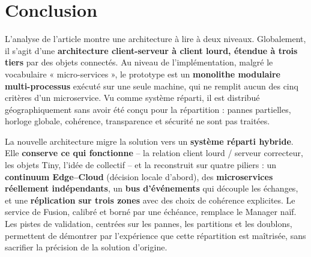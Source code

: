 \documentclass[11pt,a4paper]{article}
\begin{document}
\section{Conclusion}

L'analyse de l'article montre une architecture à lire à deux niveaux. Globalement, il s'agit d'une \textbf{architecture client-serveur à client lourd, étendue à trois tiers} par des objets connectés. Au niveau de l'implémentation, malgré le vocabulaire « micro-services », le prototype est un \textbf{monolithe modulaire multi-processus} exécuté sur une seule machine, qui ne remplit aucun des cinq critères d'un microservice. Vu comme système réparti, il est distribué géographiquement sans avoir été conçu pour la répartition : pannes partielles, horloge globale, cohérence, transparence et sécurité ne sont pas traitées.

La nouvelle architecture migre la solution vers un \textbf{système réparti hybride}. Elle \textbf{conserve ce qui fonctionne} -- la relation client lourd / serveur correcteur, les objets Tiny, l'idée de collectif -- et la reconstruit sur quatre piliers : un \textbf{continuum Edge--Cloud} (décision locale d'abord), des \textbf{microservices réellement indépendants}, un \textbf{bus d'événements} qui découple les échanges, et une \textbf{réplication sur trois zones} avec des choix de cohérence explicites. Le service de Fusion, calibré et borné par une échéance, remplace le Manager naïf. Les pistes de validation, centrées sur les pannes, les partitions et les doublons, permettent de démontrer par l'expérience que cette répartition est maîtrisée, sans sacrifier la précision de la solution d'origine.
\end{document}
